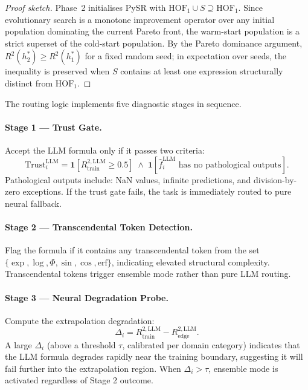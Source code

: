 \documentclass[twoside,11pt]{article}
\begin{document}
\begin{proof}[Proof sketch]
Phase~2 initialises PySR with $\mathrm{HOF}_1 \cup S \supseteq \mathrm{HOF}_1$.
Since evolutionary search is a monotone improvement operator over any
initial population dominating the current Pareto front, the warm-start
population is a strict superset of the cold-start population.
By the Pareto dominance argument, $R^2(h^*_2) \geq R^2(h^*_1)$
for a fixed random seed; in expectation over seeds, the inequality is
preserved when $S$ contains at least one expression structurally
distinct from $\mathrm{HOF}_1$.
\end{proof}

The routing logic implements five diagnostic stages in sequence.

\paragraph{Stage 1 --- Trust Gate.}
Accept the LLM formula only if it passes two criteria:
\begin{equation}
  \text{Trust}_i^{\mathrm{LLM}} = \mathbf{1}\!\left[{R^{2,\mathrm{LLM}}_{\mathrm{train}}} \ge 0.5\right]
  \;\land\; \mathbf{1}\!\left[\hat{f}^{\mathrm{LLM}}_i \text{ has no pathological outputs}\right].
  \label{eq:trust}
\end{equation}
Pathological outputs include: NaN values, infinite predictions, and division-by-zero
exceptions.  If the trust gate fails, the task is immediately routed to pure neural
fallback.

\paragraph{Stage 2 --- Transcendental Token Detection.}
Flag the formula if it contains any transcendental token from the set
$\{\exp, \log, \Phi, \sin, \cos, \mathrm{erf}\}$, indicating elevated structural
complexity.  Transcendental tokens trigger ensemble mode rather than pure LLM
routing.

\paragraph{Stage 3 --- Neural Degradation Probe.}
Compute the extrapolation degradation:
\begin{equation}
  \Delta_i = {R^{2,\mathrm{LLM}}_{\mathrm{train}}} - {R^{2,\mathrm{LLM}}_{\mathrm{edge}}}.
  \label{eq:degradation}
\end{equation}
A large $\Delta_i$ (above a threshold $\tau$, calibrated per domain category)
indicates that the LLM formula degrades rapidly near the training boundary,
suggesting it will fail further into the extrapolation region.  When $\Delta_i > \tau$,
ensemble mode is activated regardless of Stage 2 outcome.
\end{document}

